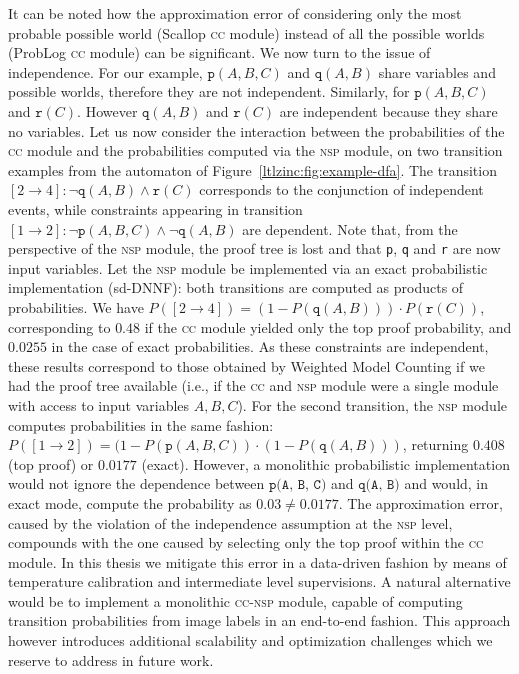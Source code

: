 It can be noted how the approximation error of considering only the most probable possible
world (Scallop \textsc{cc} module) instead of all the possible worlds (ProbLog \textsc{cc} module) can be significant.
%
We now turn to the issue of independence. For our example, $\texttt{p}(A,B,C)$ and $\texttt{q}(A, B)$ share variables and possible worlds, therefore they are not independent. Similarly, for $\texttt{p}(A, B, C)$ and $\texttt{r}(C)$. However 
$\texttt{q}(A, B)$ and $\texttt{r}(C)$ are independent because they share no variables.
Let us now consider the interaction between the probabilities of the \textsc{cc} module and the probabilities computed via the \textsc{nsp} module, on two transition examples from the automaton of Figure~\ref{ltlzinc:fig:example-dfa}. The transition $[2\rightarrow4]: \neg \texttt{q}(A, B) \wedge \texttt{r}(C)$ corresponds to the conjunction of independent events, while constraints appearing in transition $[1\rightarrow2]: \neg \texttt{p}(A,B,C) \wedge \neg \texttt{q}(A, B)$ are dependent. Note that, from the perspective of the \textsc{nsp} module, the proof tree is lost and that \texttt{p}, \texttt{q} and \texttt{r} are now input variables.
Let the \textsc{nsp} module be implemented via an exact probabilistic implementation (sd-DNNF): both transitions are computed as products of probabilities.
We have $P([2\rightarrow4]) = (1 - P(\texttt{q}(A, B))) \cdot P(\texttt{r}(C))$, corresponding to $0.48$ if the \textsc{cc} module yielded only the top proof probability, and $0.0255$ in the case of exact probabilities. As these constraints are independent, these results correspond to those obtained by Weighted Model Counting if we had the proof tree available (i.e., if the \textsc{cc} and \textsc{nsp} module were a single module with access to input variables $A, B, C$).
For the second transition, the \textsc{nsp} module computes probabilities in the same fashion: $P([1 \rightarrow 2]) = (1 - P(\texttt{p}(A, B, C)) \cdot (1 - P(\texttt{q}(A, B)))$, returning $0.408$ (top proof) or $0.0177$ (exact). However, a monolithic probabilistic implementation would not ignore the
dependence between $\texttt{p(A, B, C)}$ and $\texttt{q(A, B)}$ and would, in exact mode, compute the probability as $0.03 \neq 0.0177$.
%
The approximation error, caused by the violation of the independence assumption at the \textsc{nsp} level, compounds with the one caused by selecting only the top proof within the \textsc{cc} module. In this thesis we mitigate this error in a data-driven fashion by means of temperature calibration and intermediate level supervisions.
A natural alternative would be to implement a monolithic \textsc{cc-nsp} module, capable of computing transition probabilities from image labels in an end-to-end fashion. This approach however introduces additional scalability and optimization challenges which we reserve to address in future work.


